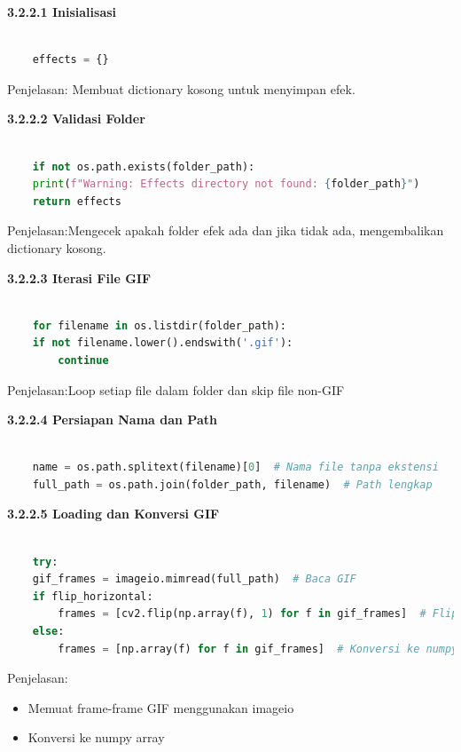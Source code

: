 \documentclass[11pt,a4paper]{article}
\begin{document}
    \noindent\textbf{3.2.2.1 Inisialisasi}
    \begin{lstlisting}[language=Python, caption=Inisialisasi]
        
    effects = {}
    \end{lstlisting}
    Penjelasan: Membuat dictionary kosong untuk menyimpan efek.

    \noindent\textbf{3.2.2.2 Validasi Folder}
    \begin{lstlisting}[language=Python, caption=Validasi Folder]
        
    if not os.path.exists(folder_path):
    print(f"Warning: Effects directory not found: {folder_path}")
    return effects
    \end{lstlisting}
    Penjelasan:Mengecek apakah folder efek ada dan jika tidak ada, mengembalikan dictionary kosong.

    \noindent\textbf{3.2.2.3 Iterasi File GIF}
    \begin{lstlisting}[language=Python, caption=Validasi Folder]
        
    for filename in os.listdir(folder_path):
    if not filename.lower().endswith('.gif'):
        continue
    \end{lstlisting}
    Penjelasan:Loop setiap file dalam folder dan skip file non-GIF

    \noindent\textbf{3.2.2.4 Persiapan Nama dan Path}
    \begin{lstlisting}[language=Python, caption=Persiapan Nama dan Path]
        
    name = os.path.splitext(filename)[0]  # Nama file tanpa ekstensi
    full_path = os.path.join(folder_path, filename)  # Path lengkap
    \end{lstlisting}

    \noindent\textbf{3.2.2.5 Loading dan Konversi GIF}
    \begin{lstlisting}[language=Python, caption=Validasi Folder]
        
    try:
    gif_frames = imageio.mimread(full_path)  # Baca GIF
    if flip_horizontal:
        frames = [cv2.flip(np.array(f), 1) for f in gif_frames]  # Flip horizontal
    else:
        frames = [np.array(f) for f in gif_frames]  # Konversi ke numpy array
    \end{lstlisting}
    Penjelasan:
    \begin{itemize}
        \item Memuat frame-frame GIF menggunakan imageio
        \item Konversi ke numpy array
    \end{itemize}
\end{document}
